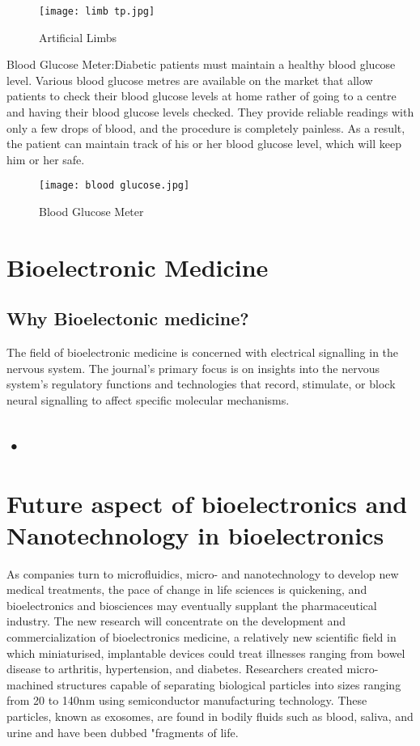 \documentclass[12pt]{report}
\begin{document}
	
	
\begin{figure}[h]
\centering
\texttt{[image: limb tp.jpg]}
\caption{Artificial Limbs}
\end{figure}
	
	Blood Glucose Meter:Diabetic patients must maintain a healthy blood glucose level. Various blood glucose metres are available on the market that allow patients to check their blood glucose levels at home rather of going to a centre and having their blood glucose levels checked. They provide reliable readings with only a few drops of blood, and the procedure is completely painless. As a result, the patient can maintain track of his or her blood glucose level, which will keep him or her safe.
		
\begin{figure}[h]
\centering
\texttt{[image: blood glucose.jpg]}
\caption{Blood Glucose Meter}
\end{figure}

\clearpage

\section{Bioelectronic Medicine}
\subsection{Why Bioelectonic medicine?}
The field of bioelectronic medicine is concerned with electrical signalling in the nervous system. The journal's primary focus is on insights into the nervous system's regulatory functions and technologies that record, stimulate, or block neural signalling to affect specific molecular mechanisms.

\subsection{•}

\section{Future aspect of bioelectronics and Nanotechnology in bioelectronics}

As companies turn to microfluidics, micro- and nanotechnology to develop new medical treatments, the pace of change in life sciences is quickening, and bioelectronics and biosciences may eventually supplant the pharmaceutical industry. The new research will concentrate on the development and commercialization of bioelectronics medicine, a relatively new scientific field in which miniaturised, implantable devices could treat illnesses ranging from bowel disease to arthritis, hypertension, and diabetes. Researchers created micro-machined structures capable of separating biological particles into sizes ranging from 20 to 140nm using semiconductor manufacturing technology. These particles, known as exosomes, are found in bodily fluids such as blood, saliva, and urine and have been dubbed "fragments of life.
\end{document}
